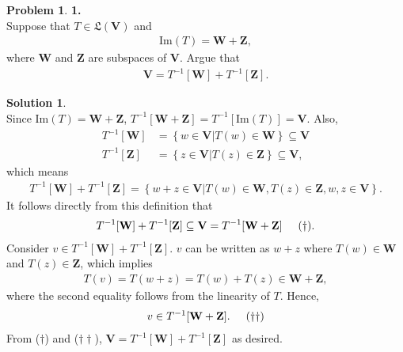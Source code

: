 \documentclass{article}
\theoremstyle{definition}
\newtheorem*{prob*}{Problem}
\newtheorem*{sln*}{Solution}
\newcommand{\V}{\mathbf{V}}
\newcommand{\W}{\mathbf{W}}
\newcommand{\Z}{\mathbf{Z}}
\newcommand{\ima}{\text{Im}}
\begin{document}
\begin{prob*}\textbf{1.}\\
	
	Suppose that $T \in \mathfrak{L}(\V)$ and
	\begin{align*}
	\ima(T)= \W + \Z,
	\end{align*}
	where $\W$ and $\Z$ are subspaces of $\V$. Argue that
	\begin{align*}
	\V = T^{-1}[\W] + T^{-1}[\Z].
	\end{align*}
	
	\begin{sln*}
		$\,$\\
		
		Since $\ima(T) = \W + \Z$, $T^{-1}[\W + \Z] = T^{-1}[\ima(T)] = \V$. Also,
		\begin{align*}
		T^{-1}[\W] &= \left\{ w \in \V \big\vert T(w) \in \W \right\} \subseteq \V\\
		T^{-1}[\Z] &= \left\{ z \in \V \big\vert T(z) \in \Z \right\} \subseteq \V,
		\end{align*}
		which means
		\begin{align*}
		T^{-1}[\W] + T^{-1}[\Z] = \left\{ w+z \in \V \big\vert T(w)\in\W, T(z)\in \Z, w,z\in \V \right\}.
		\end{align*}
		It follows directly from this definition that 
		\begin{align*}
		T^{-1}[\W] + T^{-1}[\Z] \subseteq \V = T^{-1}[\W+\Z]\hspace{0.5cm}(\dagger).
		\end{align*}
		Consider $v\in T^{-1}[\W] + T^{-1}[\Z]$. $v$ can be written as $w+z$ where $T(w) \in \W$ and $T(z)\in \Z$, which implies
		\begin{align*}
		T(v) = T(w+z) = T(w) + T(z) \in \W + \Z,
		\end{align*}
		where the second equality follows from the linearity of $T$. Hence, 
		\begin{align*}
		v\in T^{-1}[\W + \Z]. \hspace{0.5cm} (\dagger\dagger)
		\end{align*}
		From ($\dagger$) and ($\dagger\dagger$), $\V = T^{-1}[\W] + T^{-1}[\Z]$ as desired. 
	\end{sln*}
\end{prob*}


\newpage
\end{document}
